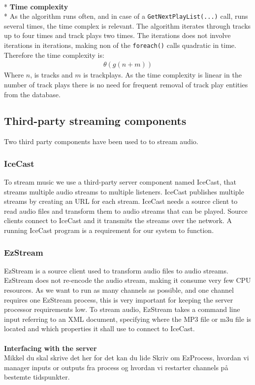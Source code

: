 \documentclass[a4paper,11pt,report]{article}
\begin{document}
\textbf{ } \\*
\textbf{Time complexity} \\*
As the algorithm runs often, and in case of a \texttt{GetNextPlayList(...)} call, runs several times, the time complex is relevant. The algorithm iterates through tracks up to four times and track plays two times. The iterations does not involve iterations in iterations, making non of the \texttt{foreach()} calls quadratic in time. Therefore the time complexity is: 
\begin{align*}
\theta (g(n + m))
\end{align*}
Where \begin{math}n\end{math}, is tracks and \begin{math}m\end{math} is trackplays. As the time complexity is linear in the number of track plays there is no need for frequent removal of track play entities from the database.

\subsection{Third-party streaming components}
Two third party components have been used to to stream audio.
\subsubsection{IceCast}
To stream music we use a third-party server component named IceCast\cite{IceCast}, that streams multiple audio streams to multiple listeners. IceCast publishes multiple streams by creating an URL for each stream. IceCast needs a source client to read audio files and transform them to audio streams that can be played. Source clients connect to IceCast and it transmits the streams over the network. A running IceCast program is a requirement for our system to function.
\subsubsection{EzStream}
EzStream\cite{EzStream} is a source client used to transform audio files to audio streams. EzStream does not re-encode the audio stream, making it consume very few CPU resources. As we want to run as many channels as possible, and one channel requires one EzStream process, this is very important for keeping the server processor requirements low. To stream audio, EzStream takes a command line input referring to an XML document, specifying where the MP3 file or m3u file is located and which properties it shall use to connect to IceCast. \\ \\
\textbf{Interfacing with the server} \\
Mikkel du skal skrive det her for det kan du lide
Skriv om EzProcess, hvordan vi manager inputs or outputs fra process og hvordan vi restarter channels på bestemte tidspunkter.
\end{document}
